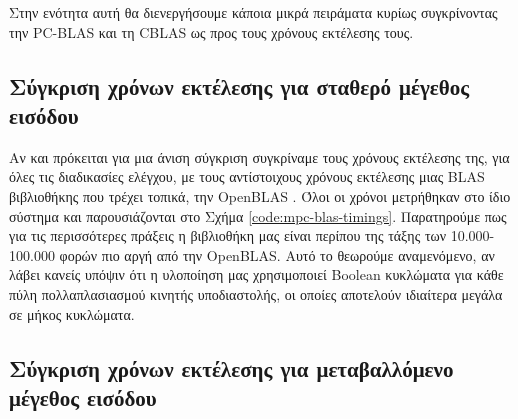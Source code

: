 Στην ενότητα αυτή θα διενεργήσουμε κάποια μικρά πειράματα κυρίως συγκρίνοντας την PC-BLAS και τη CBLAS ως προς τους χρόνους εκτέλεσης τους.

\subsection{Σύγκριση χρόνων εκτέλεσης για σταθερό μέγεθος εισόδου}

Αν και πρόκειται για μια άνιση σύγκριση συγκρίναμε τους χρόνους εκτέλεσης της, για όλες τις διαδικασίες ελέγχου, με τους αντίστοιχους χρόνους εκτέλεσης μιας BLAS βιβλιοθήκης που τρέχει τοπικά, την OpenBLAS \cite{xian2011openblas}. Όλοι οι χρόνοι μετρήθηκαν στο ίδιο σύστημα και παρουσιάζονται στο Σχήμα \ref{code:mpc-blas-timings}. Παρατηρούμε πως για τις περισσότερες πράξεις η βιβλιοθήκη μας είναι περίπου της τάξης των 10.000-100.000 φορών πιο αργή από την OpenBLAS. Αυτό το θεωρούμε αναμενόμενο, αν λάβει κανείς υπόψιν ότι η υλοποίηση μας χρησιμοποιεί Boolean κυκλώματα για κάθε πύλη πολλαπλασιασμού κινητής υποδιαστολής, οι οποίες αποτελούν ιδιαίτερα μεγάλα σε μήκος κυκλώματα.


\subsection{Σύγκριση χρόνων εκτέλεσης για μεταβαλλόμενο μέγεθος εισόδου}


